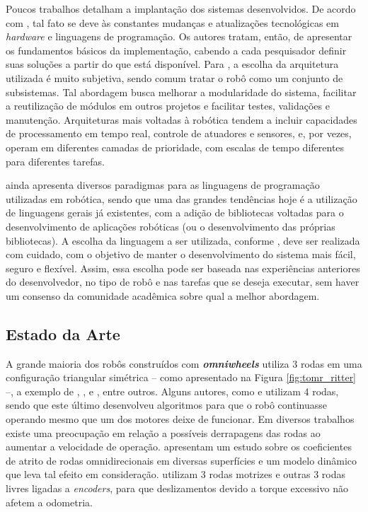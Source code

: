 

Poucos trabalhos detalham a implantação dos sistemas desenvolvidos. De acordo com \cite{craig2017introduction}, tal fato se deve às constantes mudanças e atualizações tecnológicas em \textit{hardware} e linguagens de programação. Os autores tratam, então, de apresentar os fundamentos básicos da implementação, cabendo a cada pesquisador definir suas soluções a partir do que está disponível. Para \cite{siciliano2016springer}, a escolha da arquitetura utilizada é muito subjetiva, sendo comum tratar o robô como um conjunto de subsistemas. Tal abordagem busca melhorar a modularidade do sistema, facilitar a reutilização de módulos em outros projetos e facilitar testes, validações e manutenção. Arquiteturas mais voltadas à robótica tendem a incluir capacidades de processamento em  tempo real, controle de atuadores e sensores, e, por vezes, operam em diferentes camadas de prioridade, com escalas de tempo diferentes para diferentes tarefas.

\cite{craig2017introduction} ainda apresenta diversos paradigmas para as linguagens de programação utilizadas em robótica, sendo que uma das grandes tendências hoje é a utilização de linguagens gerais já existentes, com a adição de bibliotecas voltadas para o desenvolvimento de aplicações robóticas (ou o desenvolvimento das próprias bibliotecas). A escolha da linguagem a ser utilizada, conforme \cite{siciliano2016springer}, deve ser realizada com cuidado, com o objetivo de manter o desenvolvimento do sistema mais fácil, seguro e flexível. Assim, essa escolha pode ser baseada nas experiências anteriores do desenvolvedor, no tipo de robô e nas tarefas que se deseja executar, sem haver um consenso da comunidade acadêmica sobre qual a melhor abordagem.

\subsection{Estado da Arte}


A grande maioria dos robôs construídos com \textbf{\emph{omniwheels}} utiliza 3 rodas em uma configuração triangular simétrica -- como apresentado na Figura \ref{fig:tomr_ritter} --, a exemplo de \cite{ritter2016modelagem}, \cite{samani2007comprehensive}, \cite{williams2002dynamic} e \cite{indiveri2009swedish}, entre outros. Alguns autores, como \cite{krinkin2015design} e \cite{rojas2006holonomic} utilizam 4 rodas, sendo que este último desenvolveu algoritmos para que o robô continuasse operando mesmo que um dos motores deixe de funcionar. Em diversos trabalhos existe uma preocupação em relação a possíveis derrapagens das rodas ao aumentar a velocidade de operação. \cite{williams2002dynamic} apresentam um estudo sobre os coeficientes de atrito de rodas omnidirecionais em diversas superfícies e um modelo dinâmico que leva tal efeito em consideração. \cite{samani2007comprehensive} utilizam 3 rodas motrizes e outras 3 rodas livres ligadas a \textit{encoders}, para que deslizamentos devido a torque excessivo não afetem a odometria.

